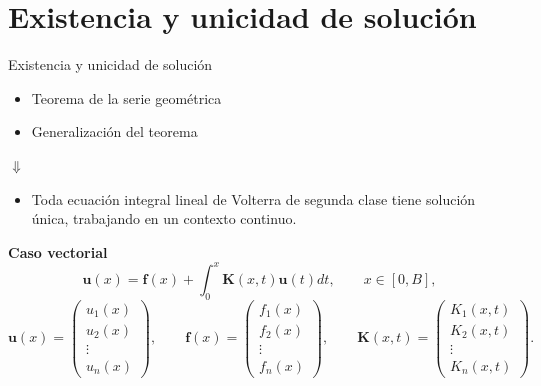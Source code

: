 \documentclass{beamer}
\begin{document}
\section{Existencia y unicidad de solución}
\begin{frame}{Existencia y unicidad de solución}
\begin{itemize}
	\item Teorema de la serie geométrica
	\item Generalización del teorema
\end{itemize}
\vspace*{0.5cm}
\centering
$\Downarrow$
\vspace*{0.5cm}
\begin{itemize}
	\item Toda ecuación integral lineal de Volterra de segunda clase tiene solución única, trabajando en un contexto continuo.
\end{itemize}
\end{frame}
\begin{frame}
	\centering
	\textbf{Caso vectorial}
	\begin{equation*}
		\textbf{u}(x) = \textbf{f}(x) + \int_0^x \textbf{K}(x,t)\textbf{u}(t)dt, \qquad x \in [0,B],
	\end{equation*}
	\begin{equation*}
		\textbf{u}(x) = \begin{pmatrix}	u_1(x) \\ u_2(x) \\ \vdots \\ u_n(x)	\end{pmatrix}, \qquad \textbf{f}(x) = \begin{pmatrix}	f_1(x) \\ f_2(x) \\ \vdots \\ f_n(x)	\end{pmatrix}, \qquad \textbf{K}(x,t) = \begin{pmatrix}	K_1(x,t) \\ K_2(x,t) \\ \vdots \\ K_n(x,t)	\end{pmatrix}.
	\end{equation*}
\end{frame}
\end{document}
